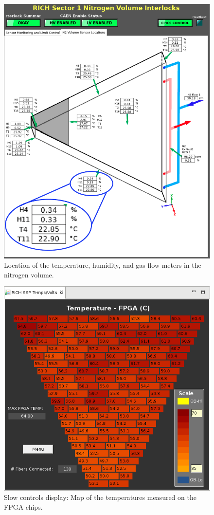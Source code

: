 \documentclass[5p,times,twocolumn]{elsarticle}
\begin{document}
\begin{figure}[t]
\begin{center}
\includegraphics[width=0.8\columnwidth]{RICH_sensors_nitrogen2.png}
\end{center}
\caption{Location of the temperature, humidity, and gas flow meters in the nitrogen volume.}
\label{Fig:RICH_sensors_nitrogen}
\end{figure}

\begin{figure}[t]
\begin{center}
\includegraphics[width=0.7\columnwidth]{FPGATempMap.png}
\end{center}
\caption{Slow controls display: Map of the temperatures measured on the FPGA chips.}
\label{fig:Online_FPGATempMap}
\end{figure}
\end{document}
